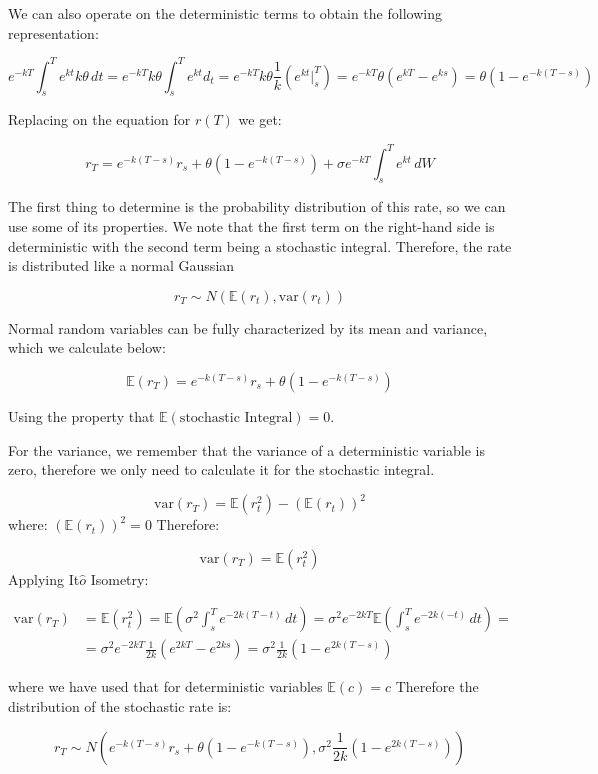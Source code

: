 We can also operate on the deterministic terms to obtain the following
representation:

\[e^{-kT}\int^T_s e^{kt}k\theta\,dt=e^{-kT}k\theta\int^T_s e^{kt}d_t=e^{-kT}k\theta\frac{1}{k}(e^{kt}|^T_s)= e^{-kT}\theta(e^{kT}-e^{ks})=\theta\left(1-e^{-k(T-s)}\right)\]

Replacing on the equation for \(r(T)\) we get:

\[r_T=e^{-k(T-s)} r_s+\theta(1-e^{-k(T-s)})+ \sigma e^{-kT}\int^T_s e^{kt}\,dW\]

The first thing to determine is the probability distribution of this
rate, so we can use some of its properties. We note that the first term
on the right-hand side is deterministic with the
second term being a stochastic integral.
Therefore, the rate is distributed like a normal Gaussian

\[r_T \sim N(\mathbb{E}(r_t), \textrm{var}(r_t))\]

Normal random variables can be fully characterized by its mean and
variance, which we calculate below:

\[\mathbb{E}(r_T)=e^{-k(T-s)} r_s+\theta\left(1-e^{-k(T-s)}\right)\]

Using the property that
\(\mathbb{E}(\textrm{stochastic~Integral}) = 0\).

For the variance, we remember that the variance of a deterministic
variable is zero, therefore we only need to calculate it for the
stochastic integral. %

\[\textrm{var}(r_T)=\mathbb{E}(r^2_t)-(\mathbb{E}(r_t))^2\] where:
\((\mathbb{E}(r_t))^2 =0\) Therefore:

\[\textrm{var}(r_T)=\mathbb{E}(r^2_t)\] Applying It\(\hat{o}\) Isometry:

\[
\begin{gathered}
\textrm{var}(r_T)&=\mathbb{E}(r^2_t)=\mathbb{E}(\sigma^2 \int^T_s e^{-2k(T-t)}\,dt)
=\sigma^2 e^{-2kT} \mathbb{E}( \int^T_s e^{-2k(-t)}\,dt)=\\
&=\sigma^2 e^{-2kT} \frac {1}{2k}(e^{2kT}-e^{2ks})
=\sigma^2 \frac {1}{2k}(1-e^{2k(T-s)}) 
\end{gathered}
\]

where we have used that for deterministic variables
\(\mathbb{E}(c) = c\) Therefore the distribution of the stochastic rate
is:

\[r_T \sim N(e^{-k(T-s)} r_s+\theta(1-e^{-k(T-s)}),\sigma^2 \frac {1}{2k}(1-e^{2k(T-s)}))\]

